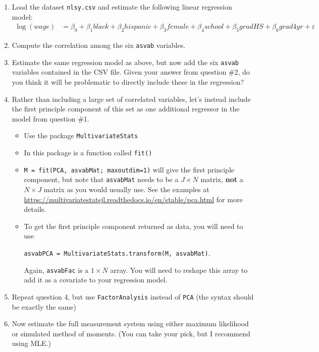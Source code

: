 \documentclass[12pt,english]{article}
\begin{document}
\begin{enumerate}
\item Load the dataset \texttt{nlsy.csv} and estimate the following linear regression model:
\begin{align*}
    \log(wage) &= \beta_0 + \beta_1 black + \beta_2 hispanic + \beta_3 female + \beta_4 school + \beta_5 gradHS + \beta_6 grad4yr + \varepsilon
\end{align*}

\item Compute the correlation among the six \texttt{asvab} variables.

\item Estimate the same regression model as above, but now add the six \texttt{asvab} variables contained in the CSV file. Given your answer from question \#2, do you think it will be problematic to directly include these in the regression?

\item Rather than including a large set of correlated variables, let's instead include the first principle component of this set as one additional regressor in the model from question \#1.
\begin{itemize}
    \item Use the package \texttt{MultivariateStats}
    \item In this package is a function called \texttt{fit()}
    \item \texttt{M = fit(PCA, asvabMat; maxoutdim=1)} will give the first principle component, but note that \texttt{asvabMat} needs to be a $J\times N$ matrix, \textbf{not} a $N\times J$ matrix as you would usually use. See the examples at \url{https://multivariatestatsjl.readthedocs.io/en/stable/pca.html} for more details.
    \item To get the first principle component returned as data, you will need to use
    
    \texttt{asvabPCA = MultivariateStats.transform(M, asvabMat)}.
    
    Again, \texttt{asvabFac} is a $1 \times N$ array. You will need to reshape this array to add it as a covariate to your regression model.
\end{itemize}

\item Repeat question 4, but use \texttt{FactorAnalysis} instead of \texttt{PCA} (the syntax should be exactly the same)

\item Now estimate the full measurement system using either maximum likelihood or simulated method of moments. (You can take your pick, but I recommend using MLE.) 


\end{enumerate}
\end{document}
